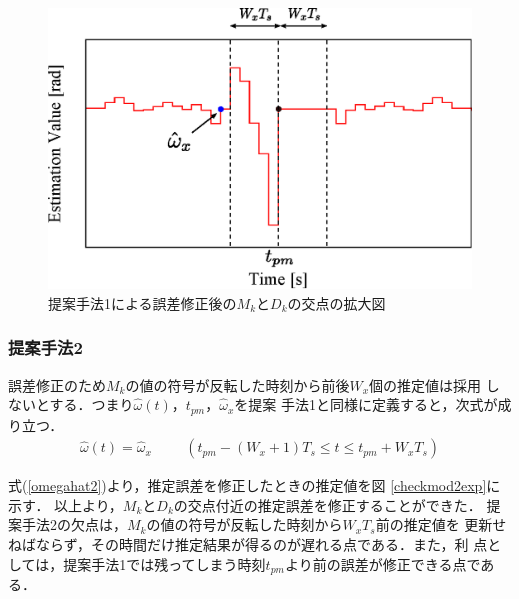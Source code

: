 \documentclass[a4paper,12pt]{jarticle}
\begin{document}
\vspace{1cm}
 \begin{figure}[htbp]
 \centering
 \includegraphics[scale=0.9]{checkmod1exp.eps}
 \hspace{103mm}
    \caption{提案手法1による誤差修正後の$M_k$と$D_k$の交点の拡大図}
		\label{checkmod1exp}
\end{figure}
\clearpage
\subsubsection{提案手法2}
誤差修正のため$M_k$の値の符号が反転した時刻から前後$W_x$個の推定値は採用
しないとする．つまり$\hat{\omega}(t)$，$t_{pm}$，$\hat{\omega}_x$を提案
手法1と同様に定義すると，次式が成り立つ．
\begin{align}
 \hat{\omega}(t)=\hat{\omega}_x \hspace{1cm} ( t_{pm}-(W_x+1)T_s \leq t
 \leq t_{pm}+W_xT_s )
\label{omegahat2}
\end{align}

式(\ref{omegahat2})より，推定誤差を修正したときの推定値を図
\ref{checkmod2exp}に示す．
以上より，$M_k$と$D_k$の交点付近の推定誤差を修正することができた．
提案手法2の欠点は，$M_k$の値の符号が反転した時刻から$W_xT_s$前の推定値を
更新せねばならず，その時間だけ推定結果が得るのが遅れる点である．また，利
点としては，提案手法1では残ってしまう時刻$t_{pm}$より前の誤差が修正できる点である．
\end{document}
